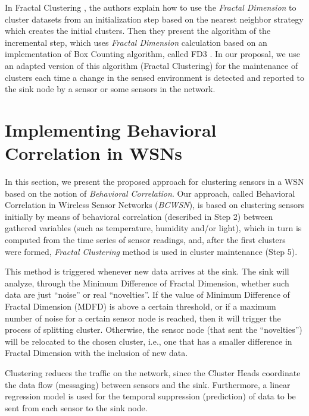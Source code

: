 \documentclass{acm_proc_article-sp}
\begin{document}
In Fractal Clustering \cite{Barbara2000}, the authors explain how to use the
\textit{Fractal Dimension} to cluster datasets from an initialization step
based on the nearest neighbor strategy which creates the initial clusters. Then
they present the algorithm of the incremental step, which uses \textit{Fractal
Dimension} calculation based on an implementation of Box Counting algorithm,
called FD3 \cite{Liebovitch1989}. In our proposal, we use an adapted version of
this algorithm (Fractal Clustering) for the maintenance of clusters each time a
change in the sensed environment is detected and reported to the sink node by
a sensor or some sensors in the network.

\section{Implementing Behavioral Correlation in WSNs}
\label{implementing-bcwsn}

In this section, we present the proposed approach for clustering sensors in a
WSN based on the notion of {\it Behavioral Correlation}. Our approach, called
Behavioral Correlation in Wireless Sensor Networks (\textit{BCWSN}),
is based on clustering sensors initially by means of behavioral correlation
(described in Step 2) between gathered variables (such as temperature, humidity 
and/or light), which in turn is computed from the time series
of sensor readings, and, after the first clusters were formed, \textit{Fractal
Clustering} method is used in cluster maintenance (Step 5).
\vspace*{-.3cm}

This method is triggered whenever new data arrives at the sink.
The sink will analyze, through the Minimum Difference of Fractal Dimension,
whether such data are just ``noise'' or real ``novelties''. If the
value of Minimum Difference of Fractal Dimension (MDFD) is above a certain threshold, or
if a maximum number of noise for a certain sensor node is reached, then it
will trigger the process of splitting cluster. Otherwise, the sensor node
(that sent the ``novelties'') will be relocated to the chosen cluster, i.e., one that
has a smaller difference in Fractal Dimension with the inclusion of new data.
\vspace*{-.3cm}

Clustering reduces the traffic on the network, since the Cluster Heads
coordinate the data flow (messaging) between sensors and the sink.
Furthermore, a linear regression model is used for the temporal suppression
(prediction) of data to be sent from each sensor to the sink node.
\vspace*{-.3cm}
\end{document}
